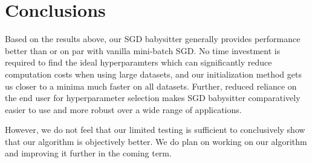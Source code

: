 \documentclass{article}
\begin{document}
\section{Conclusions}
\par Based on the results above, our SGD babysitter generally provides performance better than or on par with vanilla mini-batch SGD. No time investment is required to find the ideal hyperparamters which can significantly reduce computation costs when using large datasets, and our initialization method gets us closer to a minima much faster on all datasets. Further, reduced reliance on the end user for hyperparameter selection makes SGD babysitter comparatively easier to use and more robust over a wide range of applications. 

\par However, we do not feel that our limited testing is sufficient to conclusively show that our algorithm is objectively better. We do plan on working on our algorithm and improving it further in the coming term.
 
\newpage



\end{document}
